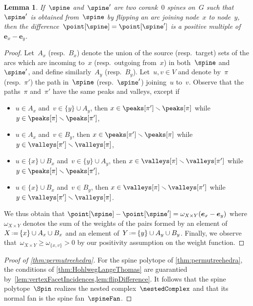 \documentclass{amsart}
\newtheorem{lemma}[theorem]{Lemma}
\theoremstyle{definition}
\renewcommand{\b}[1]{{\boldsymbol{#1}}} %
\newcommand{\ssm}{\smallsetminus} %
\newcommand{\eqdef}{\mbox{\,\raisebox{0.2ex}{\scriptsize\ensuremath{\mathrm:}}\ensuremath{=}\,}} %
\newcommand{\vertexSet}{V}
\newcommand{\weight}{\omega} %
\begin{document}
\begin{lemma}
  \label{lem:flipDifference}
  If~$\spine$ and~$\spine'$ are two corank~$0$ spines on~$G$ such that~$\spine'$ is obtained from~$\spine$ by flipping an arc joining node~$x$ to node~$y$, then the difference~$\point[\spine] = \point[\spine']$ is a positive multiple of~$\b{e}_x - \b{e}_y$.
\end{lemma}

\begin{proof}
  Let~$A_x$ (resp.~$B_x$) denote the union of the source (resp.~target) sets of the arcs which are incoming to~$x$ (resp.~outgoing from~$x$) in both~$\spine$ and~$\spine'$, and define similarly~$A_y$ (resp.~$B_y$).
  Let~$u,v \in \vertexSet$ and denote by~$\pi$ (resp.~$\pi'$) the path in~$\spine$ (resp.~$\spine'$) joining~$u$ to~$v$.
  Observe that the paths~$\pi$ and~$\pi'$ have the same peaks and valleys, except if
  \begin{itemize}
    \item $u \in A_x$ and~$v \in \{y\} \cup A_y$, then $x \in \peaks[\pi'] \ssm \peaks[\pi]$ while~$y \in \peaks[\pi] \ssm \peaks[\pi']$,
    \item $u \in A_x$ and~$v \in B_y$, then $x \in \peaks[\pi'] \ssm \peaks[\pi]$ while~$y \in \valleys[\pi'] \ssm \valleys[\pi]$,
    \item $u \in \{x\} \cup B_x$ and~$v \in \{y\} \cup A_y$, then $x \in \valleys[\pi] \ssm \valleys[\pi']$ while~$y \in \peaks[\pi] \ssm \peaks[\pi']$,
    \item $u \in \{x\} \cup B_x$ and~$v \in B_y$, then $x \in \valleys[\pi] \ssm \valleys[\pi']$ while~$y \in \valleys[\pi'] \ssm \valleys[\pi]$.
  \end{itemize}
  We thus obtain that
  \(
    \point[\spine] - \point[\spine'] = \weight_{X \times Y} (\b{e}_x - \b{e}_y)
  \)
  where~$\weight_{X \times Y}$ denotes the sum of the weights of the pairs formed by an element of~$X \eqdef \{x\} \cup A_x \cup B_x$ and an element of~$Y \eqdef \{y\} \cup A_y \cup B_y$.
  Finally, we observe that~$\weight_{X \times Y} \ge \weight_{\{x,v\}} > 0$ by our positivity assumption on the weight function.
\end{proof}

\begin{proof}[Proof of \cref{thm:permutreehedra}]
  For the spine polytope of \cref{thm:permutreehedra}, the conditions of \cref{thm:HohlwegLangeThomas} are guarantied by~\cref{lem:vertexFacetIncidences,lem:flipDifference}.
  It follows that the spine polytope~$\Spin$ realizes the nested complex~$\nestedComplex$ and that its normal fan is the spine fan~$\spineFan$.
\end{proof}
\end{document}
